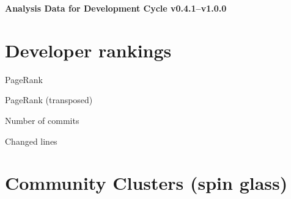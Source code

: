 \documentclass{article}
\begin{document}
\setlength{\parindent}{0pt}
\begin{center}
\begin{Large}
\textbf{Analysis Data for Development Cycle v0.4.1--v1.0.0}
\end{Large}
\end{center}
\section{Developer rankings}
\begin{small}\renewcommand{\tabcolsep}{1pt}
\begin{minipage}{0.5\linewidth}
PageRank\\

\end{minipage}%
\begin{minipage}{0.5\linewidth}
PageRank (transposed)\\

\end{minipage}

\renewcommand{\tabcolsep}{5pt}
\begin{minipage}{0.5\linewidth}
Number of commits\\

\end{minipage}%
\begin{minipage}{0.5\linewidth}
Changed lines\\

\end{minipage}
\end{small}
\newpage\section{Community Clusters (spin glass)}
\end{document}
